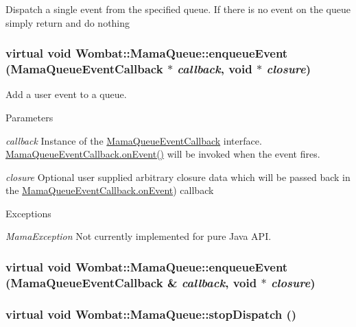 Dispatch a single event from the specified queue. If there is no event on the queue simply return and do nothing \hypertarget{classWombat_1_1MamaQueue_a8b1a038741f3d3c5cd3bcea8708003c7}{
\subsubsection[{enqueueEvent}]{\setlength{\rightskip}{0pt plus 5cm}virtual void Wombat::MamaQueue::enqueueEvent ({\bf MamaQueueEventCallback} $\ast$ {\em callback}, \/  void $\ast$ {\em closure})}}
\label{classWombat_1_1MamaQueue_a8b1a038741f3d3c5cd3bcea8708003c7}


Add a user event to a queue. 
\begin{DoxyParams}{Parameters}
\item[{\em callback}]Instance of the \hyperlink{classWombat_1_1MamaQueueEventCallback}{MamaQueueEventCallback} interface. \hyperlink{classWombat_1_1MamaQueueEventCallback_ae5d78bf4717b97e7d72858a30e2a3233}{MamaQueueEventCallback.onEvent()} will be invoked when the event fires. \item[{\em closure}]Optional user supplied arbitrary closure data which will be passed back in the \hyperlink{classWombat_1_1MamaQueueEventCallback_ae5d78bf4717b97e7d72858a30e2a3233}{MamaQueueEventCallback.onEvent}) callback \end{DoxyParams}

\begin{DoxyExceptions}{Exceptions}
\item[{\em MamaException}]Not currently implemented for pure Java API. \end{DoxyExceptions}
\hypertarget{classWombat_1_1MamaQueue_af136b615d84a68935e875a3c857a5825}{
\subsubsection[{enqueueEvent}]{\setlength{\rightskip}{0pt plus 5cm}virtual void Wombat::MamaQueue::enqueueEvent ({\bf MamaQueueEventCallback} \& {\em callback}, \/  void $\ast$ {\em closure})}}
\label{classWombat_1_1MamaQueue_af136b615d84a68935e875a3c857a5825}
\hypertarget{classWombat_1_1MamaQueue_ac5cc7a2954404933c0700b6bea16844a}{
\subsubsection[{stopDispatch}]{\setlength{\rightskip}{0pt plus 5cm}virtual void Wombat::MamaQueue::stopDispatch ()}}
\label{classWombat_1_1MamaQueue_ac5cc7a2954404933c0700b6bea16844a}


